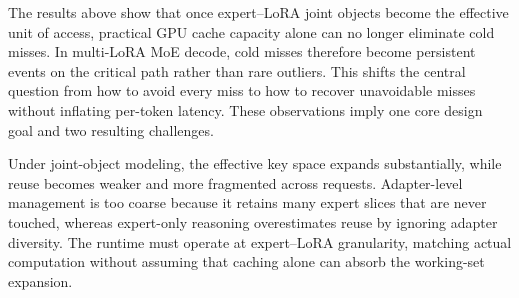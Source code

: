 \documentclass[sigplan,anonymous,review,10pt]{acmart}
\begin{document}
The results above show that once expert--LoRA joint objects become the effective unit of access, practical GPU cache capacity alone can no longer eliminate cold misses. In multi-LoRA MoE decode, cold misses therefore become persistent events on the critical path rather than rare outliers. This shifts the central question from how to avoid every miss to how to recover unavoidable misses without inflating per-token latency. These observations imply one core design goal and two resulting challenges.


Under joint-object modeling, the effective key space expands substantially, while reuse becomes weaker and more fragmented across requests. Adapter-level management is too coarse because it retains many expert slices that are never touched, whereas expert-only reasoning overestimates reuse by ignoring adapter diversity. The runtime must operate at expert--LoRA granularity, matching actual computation without assuming that caching alone can absorb the working-set expansion.
\end{document}
